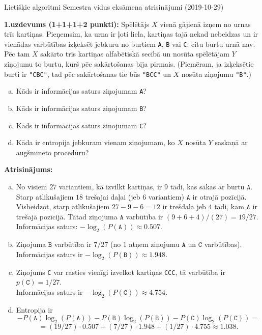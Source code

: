 \documentclass[11pt]{article}
\begin{document}
\thispagestyle{empty}

{\Large Lietišķie algoritmi \textendash{} Semestra vidus eksāmena atrisinājumi (2019-10-29)}

{\footnotesize
{\bf 1.uzdevums (1+1+1+2 punkti):}
Spēlētājs $X$ vienā gājienā izņem no urnas trīs kartiņas.
Pieņemsim, ka urna ir ļoti liela, kartiņas tajā nekad nebeidzas un ir vienādas varbūtības
izķeksēt jebkuru no burtiem {\tt A}, {\tt B} vai {\tt C}; citu burtu urnā nav.
Pēc tam $X$ sakārto trīs kartiņas alfabētiskā secībā un nosūta spēlētājam $Y$ ziņojumu \textendash{} to burtu, kurš
pēc sakārtošanas bija pirmais. (Piemēram, ja izķeksētie burti ir {\tt "CBC"}, tad pēc sakārtošanas tie būs {\tt "BCC"} un
$X$ nosūta ziņojumu {\tt "B"}.)
\begin{enumerate}[(a)]
\item Kāds ir informācijas saturs ziņojumam {\tt A}?
\item Kāds ir informācijas saturs ziņojumam {\tt B}?
\item Kāds ir informācijas saturs ziņojumam {\tt C}?
\item Kāda ir entropija jebkuram vienam ziņojumam, ko $X$ nosūta $Y$ saskaņā ar augšminēto procedūru?
\end{enumerate}
}

\vspace{6pt}
{\bf Atrisinājums:}


\begin{enumerate}[(a)]
\item No visiem $27$ variantiem, kā izvilkt kartiņas, ir $9$ tādi, kas sākas ar burtu $\mathtt{A}$. Starp atlikušajiem
$18$ trešajai daļai (jeb $6$ variantiem) $\mathtt{A}$ ir otrajā pozīcijā. Visbeidzot, starp
atlikušajiem $27 - 9 - 6 = 12$ ir trešdaļa jeb $4$ tādi, kam $\mathtt{A}$ ir trešajā pozīcijā. Tātad
ziņojuma $\mathtt{A}$ varbūtība ir $(9+6+4)/(27) = 19/27$.\\
Informācijas saturs: $-\log_2\left(P(\mathtt{A})\right) \approx 0.507$.
\item Ziņojuma $\mathtt{B}$ varbūtība ir $7/27$ (no $1$ atņem ziņojumu $\mathtt{A}$ un $\mathtt{C}$ varbūtības).\\
Informācijas saturs ir $-\log_2\left(P(\mathtt{B})\right) \approx 1.948$.
\item Ziņojums {\tt C} var rasties vienīgi izvelkot kartiņas {\tt CCC}, tā varbūtība ir $p(\mathtt{C}) = 1/27$.\\
Informācijas saturs ir $-\log_2\left(P(\mathtt{C})\right) \approx 4.754$.
\item Entropija ir
$$-P(\mathtt{A})\log_2(P(\mathtt{A})) -P(\mathtt{B})\log_2(P(\mathtt{B})) - P(\mathtt{C})\log_2(P(\mathtt{C})) =$$
$$ = (19/27)\cdot 0.507 + (7/27)\cdot 1.948 + (1/27) \cdot 4.755 \approx 1.038.$$
\end{enumerate}
\end{document}
